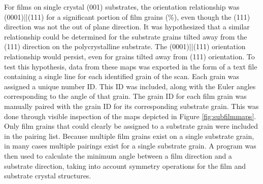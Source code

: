 For  films on single crystal  (001) substrates, the orientation relationship was (0001)||\-(111) for a significant portion of film grains (\%), even though the  (111) direction was not the out of plane direction. It was hypothesized that a similar relationship could be determined for the substrate grains tilted away from the (111) direction on the polycrystalline substrate. The (0001)||(111) orientation relationship would persist, even for grains tilted away from (111) orientation. To test this hypothesis, data from these maps was exported in the form of a text file containing a single line for each identified grain of the scan. Each grain was assigned a unique number ID. This ID was included, along with the Euler angles corresponding to the angle of that grain.  The grain ID for each film grain was manually paired with the grain ID for its corresponding substrate grain. This was done through visible inspection of the maps depicted in Figure \ref{fig:subfilmmaps}. Only film grains that could clearly be assigned to a substrate grain were included in the pairing list. Because multiple film grains exist on a single substrate grain, in many cases multiple pairings exist for a single substrate grain. A program was then used to calculate the minimum angle between a film direction and a substrate direction, taking into account symmetry operations for the film and substrate crystal structures. 

